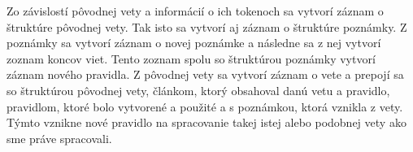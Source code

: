 Zo závislostí pôvodnej vety a informácií o ich tokenoch sa vytvorí záznam o štruktúre pôvodnej vety. Tak isto sa vytvorí aj záznam o štruktúre poznámky. Z poznámky sa vytvorí záznam o novej poznámke a následne sa z nej vytvorí zoznam koncov viet. Tento zoznam spolu so štruktúrou poznámky vytvorí záznam nového pravidla. Z pôvodnej vety sa vytvorí záznam o vete a prepojí sa so štruktúrou pôvodnej vety, článkom, ktorý obsahoval danú vetu a pravidlo, pravidlom, ktoré bolo vytvorené a použité a s poznámkou, ktorá vznikla z vety. Týmto vznikne nové pravidlo na spracovanie takej istej alebo podobnej vety ako sme práve spracovali.



